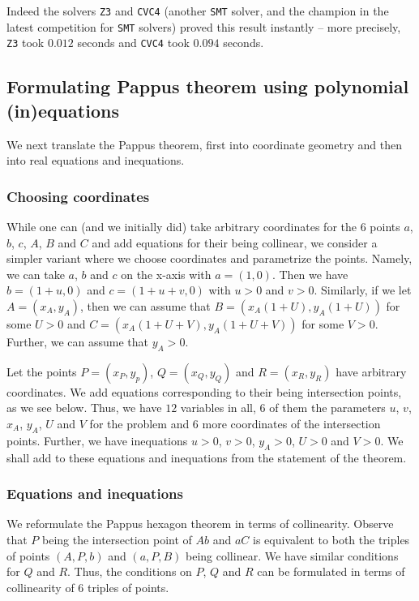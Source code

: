 \documentclass{amsart}
\theoremstyle{plain}
\theoremstyle{definition}
\theoremstyle{remark}
\begin{document}
Indeed the solvers \texttt{Z3} and \texttt{CVC4} (another \texttt{SMT} solver, and the champion in the
latest competition for \texttt{SMT} solvers) proved this result instantly -- more
precisely, \texttt{Z3} took \(0.012\) seconds and \texttt{CVC4} took \(0.094\) seconds.

\subsection{Formulating Pappus theorem using polynomial (in)equations}

We next translate the Pappus theorem, first into coordinate geometry and then into
real equations and inequations.

\subsubsection{Choosing coordinates}

While one can (and we initially did) take arbitrary coordinates for the
\(6\) points \(a\), \(b\), \(c\), \(A\), \(B\) and \(C\) and add
equations for their being collinear, we consider a simpler variant where
we choose coordinates and parametrize the points. Namely, we can take
\(a\), \(b\) and \(c\) on the x-axis with \(a = (1, 0)\). Then we have
\(b = (1 + u, 0)\) and \(c = (1 + u + v, 0)\) with \(u>0\) and \(v>0\).
Similarly, if we let \(A = (x_A, y_A)\), then we can assume that
\(B = (x_A(1+ U), y_A(1 + U))\) for some \(U > 0\) and
\(C = (x_A(1+ U + V), y_A(1 + U + V))\) for some \(V > 0\). Further, we
can assume that \(y_A > 0\).

Let the points \(P= (x_P, y_p)\), \(Q = (x_Q, y_Q)\) and
\(R= (x_R, y_R)\) have arbitrary coordinates. We add equations
corresponding to their being intersection points, as we see below. Thus,
we have \(12\) variables in all, \(6\) of them the parameters \(u\),
\(v\), \(x_A\), \(y_A\), \(U\) and \(V\) for the problem and \(6\) more
coordinates of the intersection points. Further, we have inequations
\(u >0\), \(v >0\), \(y_A >0\), \(U > 0\) and \(V >0\). We shall add to
these equations and inequations from the statement of the theorem.

\subsubsection{Equations and inequations}

We reformulate the Pappus hexagon theorem in terms of collinearity.
Observe that \(P\) being the intersection point of \(Ab\) and \(aC\) is
equivalent to both the triples of points \((A, P, b)\) and \((a, P, B)\)
being collinear. We have similar conditions for \(Q\) and \(R\). Thus,
the conditions on \(P\), \(Q\) and \(R\) can be formulated in terms of
collinearity of \(6\) triples of points.
\end{document}
